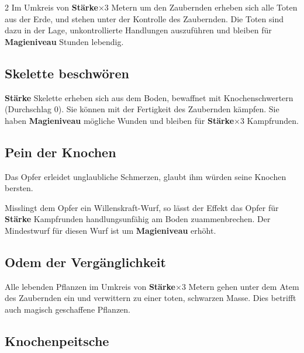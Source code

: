 \begin{multicols*}{2}
Im Umkreis von \textbf{Stärke}×3 Metern um den Zaubernden erheben sich alle Toten aus der Erde, und stehen unter der Kontrolle des Zaubernden. Die Toten sind dazu in der Lage, unkontrollierte Handlungen auszuführen und bleiben für \textbf{Magieniveau} Stunden lebendig.



\subsection{Skelette beschwören}

\textbf{Stärke} Skelette erheben sich aus dem Boden, bewaffnet mit Knochenschwertern (Durchschlag 0). Sie können mit der Fertigkeit des Zaubernden kämpfen. Sie haben \textbf{Magieniveau} mögliche Wunden und bleiben für \textbf{Stärke}×3 Kampfrunden.



\subsection{Pein der Knochen}

Das Opfer erleidet unglaubliche Schmerzen, glaubt ihm würden seine Knochen bersten.

Misslingt dem Opfer ein Willenskraft-Wurf, so lässt der Effekt das Opfer für \textbf{Stärke} Kampfrunden handlungsunfähig am Boden zuammenbrechen. Der Mindestwurf für diesen Wurf ist um \textbf{Magieniveau} erhöht.



\subsection{Odem der Vergänglichkeit}

Alle lebenden Pflanzen im Umkreis von \textbf{Stärke}×3 Metern gehen unter dem Atem des Zaubernden ein und verwittern zu einer toten, schwarzen Masse. Dies betrifft auch magisch geschaffene Pflanzen.



\subsection{Knochenpeitsche}


\end{multicols*}
